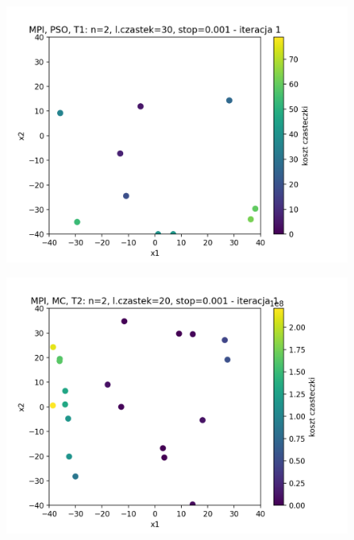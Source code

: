 \documentclass[11pt, a4paper, oneside]{article}
\begin{document}
\begin{figure}[H]
\centering
\begin{minipage}[b]{\dimexpr.5\textwidth-1em}
  \centering
  \includegraphics[width=1\linewidth]{grafiki2/MPI_PSO_T1/MPI_PSO_T1_startPositions.png}
  \label{fig:pozycjeStartowe:PSO1}
\end{minipage} \hfill
\begin{minipage}[b]{\dimexpr.5\textwidth-1em}
  \centering
  \includegraphics[width=1\linewidth]{grafiki2/MPI_MC_T2/MPI_MC_T2_startPositions.png}
  \label{fig:pozycjeStartowe:MC1}
\end{minipage}
\end{figure}
\end{document}
